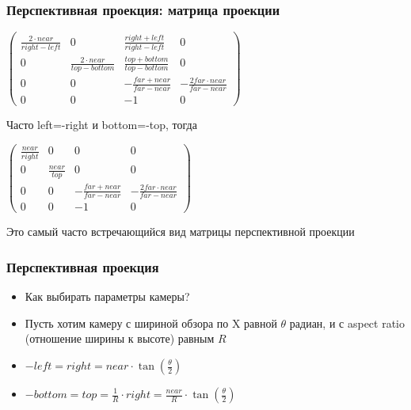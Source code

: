 \documentclass{beamer}
\begin{document}
\begin{frame}[fragile]
\frametitle{Перспективная проекция: матрица проекции}
\begin{center}
\begin{math}
\begin{pmatrix}
\frac{2\cdot near}{right - left} & 0 & \frac{right + left}{right - left} & 0 \\
0 & \frac{2\cdot near}{top - bottom} & \frac{top + bottom}{top - bottom} & 0 \\
0 & 0 & -\frac{far + near}{far - near} & -\frac{2 far \cdot near}{far - near} \\
0 & 0 & -1 & 0
\end{pmatrix}
\end{math}
\end{center}

\pause
Часто left=-right и bottom=-top, тогда

\begin{center}
\begin{math}
\begin{pmatrix}
\frac{near}{right} & 0 & 0 & 0 \\
0 & \frac{near}{top} & 0 & 0 \\
0 & 0 & -\frac{far + near}{far - near} & -\frac{2 far \cdot near}{far - near} \\
0 & 0 & -1 & 0
\end{pmatrix}
\end{math}
\end{center}
Это самый часто встречающийся вид матрицы перспективной проекции
\end{frame}

\begin{frame}[fragile]
\frametitle{Перспективная проекция}
\begin{itemize}
\item Как выбирать параметры камеры?
\pause
\item Пусть хотим камеру с шириной обзора по X равной \begin{math}\theta\end{math} радиан, и с aspect ratio (отношение ширины к высоте) равным \begin{math}R\end{math}
\pause
\item \begin{math}-left=right=near \cdot \tan\left(\frac{\theta}{2}\right)\end{math}
\item \begin{math}-bottom=top=\frac{1}{R} \cdot right = \frac{near}{R} \cdot \tan\left(\frac{\theta}{2}\right)\end{math}
\end{itemize}
\end{frame}
\end{document}
